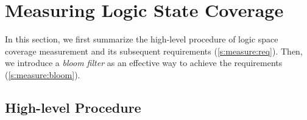 \documentclass[letterpaper,twocolumn,10pt]{article}
\begin{document}
%
%
%
%
%

\section{Measuring Logic State Coverage}
\label{s:measure}

In this section, we first summarize the high-level procedure of logic space
coverage measurement and its subsequent requirements 
(\autoref{s:measure:req}). Then, we introduce a \emph{bloom filter} as an
effective way to achieve the requirements (\autoref{s:measure:bloom}).


\subsection{High-level Procedure}
\label{s:measure:req}
\end{document}
